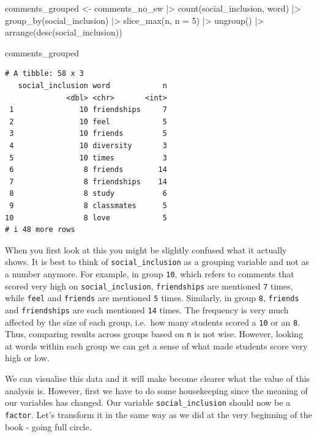 \documentclass[
  letterpaper,
  DIV=11,
  numbers=noendperiod]{scrreprt}
\newenvironment{Shaded}{\begin{snugshade}}{\end{snugshade}}
\newcommand{\AttributeTok}[1]{\textcolor[rgb]{0.40,0.45,0.13}{#1}}
\newcommand{\DecValTok}[1]{\textcolor[rgb]{0.68,0.00,0.00}{#1}}
\newcommand{\FunctionTok}[1]{\textcolor[rgb]{0.28,0.35,0.67}{#1}}
\newcommand{\NormalTok}[1]{\textcolor[rgb]{0.00,0.23,0.31}{#1}}
\newcommand{\OtherTok}[1]{\textcolor[rgb]{0.00,0.23,0.31}{#1}}
\newcommand{\SpecialCharTok}[1]{\textcolor[rgb]{0.37,0.37,0.37}{#1}}
\begin{document}
\begin{Shaded}
\begin{Highlighting}[]
\NormalTok{comments\_grouped }\OtherTok{\textless{}{-}}
\NormalTok{  comments\_no\_sw }\SpecialCharTok{|\textgreater{}}
  \FunctionTok{count}\NormalTok{(social\_inclusion, word) }\SpecialCharTok{|\textgreater{}}
  \FunctionTok{group\_by}\NormalTok{(social\_inclusion) }\SpecialCharTok{|\textgreater{}}
  \FunctionTok{slice\_max}\NormalTok{(n, }\AttributeTok{n =} \DecValTok{5}\NormalTok{) }\SpecialCharTok{|\textgreater{}}
  \FunctionTok{ungroup}\NormalTok{() }\SpecialCharTok{|\textgreater{}}
  \FunctionTok{arrange}\NormalTok{(}\FunctionTok{desc}\NormalTok{(social\_inclusion))}

\NormalTok{comments\_grouped}
\end{Highlighting}
\end{Shaded}

\begin{verbatim}
# A tibble: 58 x 3
   social_inclusion word            n
              <dbl> <chr>       <int>
 1               10 friendships     7
 2               10 feel            5
 3               10 friends         5
 4               10 diversity       3
 5               10 times           3
 6                8 friends        14
 7                8 friendships    14
 8                8 study           6
 9                8 classmates      5
10                8 love            5
# i 48 more rows
\end{verbatim}

When you first look at this you might be slightly confused what it
actually shows. It is best to think of \texttt{social\_inclusion} as a
grouping variable and not as a number anymore. For example, in group
\texttt{10}, which refers to comments that scored very high on
\texttt{social\_inclusion}, \texttt{friendships} are mentioned
\texttt{7} times, while \texttt{feel} and \texttt{friends} are mentioned
\texttt{5} times. Similarly, in group \texttt{8}, \texttt{friends} and
\texttt{friendships} are each mentioned \texttt{14} times. The frequency
is very much affected by the size of each group, i.e.~how many students
scored a \texttt{10} or an \texttt{8}. Thus, comparing results across
groups based on \texttt{n} is not wise. However, looking at words within
each group we can get a sense of what made students score very high or
low.

We can visualise this data and it will make become clearer what the
value of this analysis is. However, first we have to do some
housekeeping since the meaning of our variables has changed. Our
variable \texttt{social\_inclusion} should now be a \texttt{factor}.
Let's transform it in the same way as we did at the very beginning of
the book - going full circle.
\end{document}

